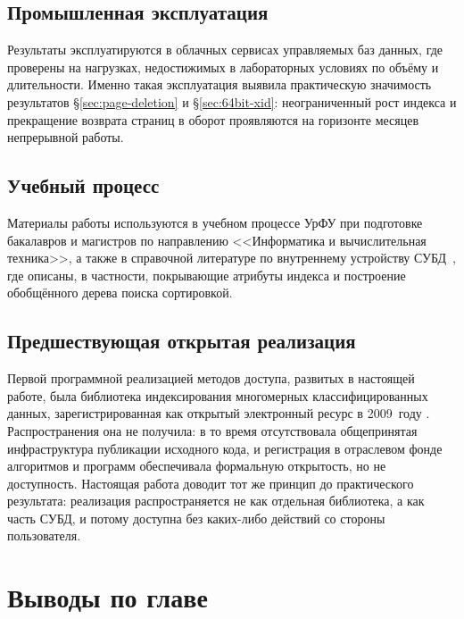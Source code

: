 \subsection{Промышленная эксплуатация}

Результаты эксплуатируются в облачных сервисах управляемых баз данных, где
проверены на нагрузках, недостижимых в лабораторных условиях по объёму и
длительности. Именно такая эксплуатация выявила практическую значимость
результатов §\ref{sec:page-deletion} и §\ref{sec:64bit-xid}: неограниченный рост
индекса и прекращение возврата страниц в оборот проявляются на горизонте
месяцев непрерывной работы.


\subsection{Учебный процесс}

Материалы работы используются в учебном процессе УрФУ при подготовке
бакалавров и магистров по направлению <<Информатика и вычислительная техника>>,
а также в справочной литературе по внутреннему устройству
СУБД~\cite{rogov2026}, где описаны, в частности, покрывающие атрибуты
индекса и построение обобщённого дерева поиска сортировкой.


\subsection{Предшествующая открытая реализация}

Первой программной реализацией методов доступа, развитых в настоящей работе,
была библиотека индексирования многомерных классифицированных данных,
зарегистрированная как открытый электронный ресурс в 2009~году
\cite{imkd2009}. Распространения она не получила: в то время отсутствовала
общепринятая инфраструктура публикации исходного кода, и регистрация в
отраслевом фонде алгоритмов и программ обеспечивала формальную открытость, но
не доступность. Настоящая работа доводит тот же принцип до практического
результата: реализация распространяется не как отдельная библиотека, а как
часть СУБД, и потому доступна без каких-либо действий со стороны пользователя.

\section{Выводы по главе}

